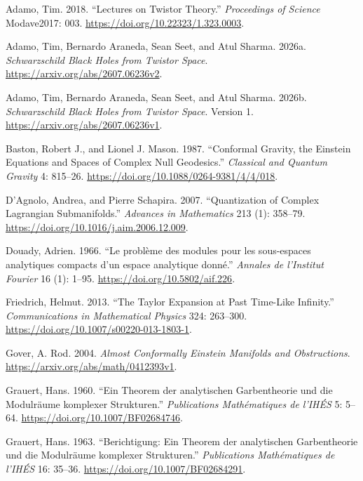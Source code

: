 \documentclass[
  english,
  11pt,
  reqno]{amsart}
\newlength{\cslhangindent}
\newenvironment{CSLReferences}[2] %
 {\begin{list}{}{%
  \setlength{\itemindent}{0pt}
  \setlength{\leftmargin}{0pt}
  \setlength{\parsep}{0pt}
  \ifodd #1
   \setlength{\leftmargin}{\cslhangindent}
   \setlength{\itemindent}{-1\cslhangindent}
  \fi
  \setlength{\itemsep}{#2\baselineskip}}}
 {\end{list}}
\begin{document}
\protect{}\label{refs}
\begin{CSLReferences}{1}{1}
\sloppy
{}
Adamo, Tim. 2018. {``Lectures on Twistor Theory.''} \emph{Proceedings of
Science} Modave2017: 003. \url{https://doi.org/10.22323/1.323.0003}.

Adamo, Tim, Bernardo Araneda, Sean Seet, and Atul Sharma. 2026a.
\emph{Schwarzschild Black Holes from Twistor Space}.
\url{https://arxiv.org/abs/2607.06236v2}.

Adamo, Tim, Bernardo Araneda, Sean Seet, and Atul Sharma. 2026b.
\emph{Schwarzschild Black Holes from Twistor Space}. Version 1.
\url{https://arxiv.org/abs/2607.06236v1}.

Baston, Robert J., and Lionel J. Mason. 1987. {``Conformal Gravity, the
{Einstein} Equations and Spaces of Complex Null Geodesics.''}
\emph{Classical and Quantum Gravity} 4: 815--26.
\url{https://doi.org/10.1088/0264-9381/4/4/018}.

D'Agnolo, Andrea, and Pierre Schapira. 2007. {``Quantization of Complex
Lagrangian Submanifolds.''} \emph{Advances in Mathematics} 213 (1):
358--79. \url{https://doi.org/10.1016/j.aim.2006.12.009}.

Douady, Adrien. 1966. {``{Le problème des modules pour les sous-espaces
analytiques compacts d'un espace analytique donné}.''} \emph{Annales de
l'Institut Fourier} 16 (1): 1--95.
\url{https://doi.org/10.5802/aif.226}.

Friedrich, Helmut. 2013. {``The {Taylor} Expansion at Past Time-Like
Infinity.''} \emph{Communications in Mathematical Physics} 324:
263--300. \url{https://doi.org/10.1007/s00220-013-1803-1}.

Gover, A. Rod. 2004. \emph{Almost Conformally {Einstein} Manifolds and
Obstructions}. \url{https://arxiv.org/abs/math/0412393v1}.

Grauert, Hans. 1960. {``{Ein Theorem der analytischen Garbentheorie und
die Modulräume komplexer Strukturen}.''} \emph{Publications
Mathématiques de l'IHÉS} 5: 5--64.
\url{https://doi.org/10.1007/BF02684746}.

Grauert, Hans. 1963. {``{Berichtigung: {Ein Theorem der analytischen
Garbentheorie und die Modulräume komplexer Strukturen}}.''}
\emph{Publications Mathématiques de l'IHÉS} 16: 35--36.
\url{https://doi.org/10.1007/BF02684291}.


\end{CSLReferences}
\end{document}
